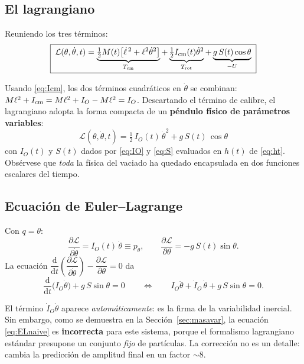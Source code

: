 \documentclass[11pt,a4paper]{article}
\newcommand{\dd}{\mathrm{d}}
\begin{document}
\subsection{El lagrangiano}

Reuniendo los tres términos:
\begin{equation}
\boxed{\;
\mathcal L(\theta,\dot\theta,t) =
\underbrace{\tfrac12 M(t)\!\left[\dot\ell^{\,2}+\ell^2\dot\theta^2\right]}_{T_{\rm cm}}
+\underbrace{\tfrac12 I_{\rm cm}(t)\dot\theta^2}_{T_{\rm rot}}
+\underbrace{g\,S(t)\cos\theta}_{-U}\;}
\label{eq:Lfull}
\end{equation}

Usando \eqref{eq:Icm}, los dos términos cuadráticos en $\dot\theta$ se combinan:
$M\ell^2 + I_{\rm cm} = M\ell^2 + I_O - M\ell^2 = I_O$. Descartando el término de calibre,
el lagrangiano adopta la forma compacta de un \textbf{péndulo físico de parámetros variables}:
\begin{equation}
\boxed{\;
\mathcal L(\theta,\dot\theta,t) = \tfrac12\,I_O(t)\,\dot\theta^2 + g\,S(t)\,\cos\theta\;}
\label{eq:L}
\end{equation}
con $I_O(t)$ y $S(t)$ dados por \eqref{eq:IO} y \eqref{eq:S} evaluados en $h(t)$ de \eqref{eq:ht}.
Obsérvese que \emph{toda} la física del vaciado ha quedado encapsulada en dos funciones escalares
del tiempo.

\subsection{Ecuación de Euler--Lagrange}

Con $q=\theta$:
\begin{equation}
\frac{\partial \mathcal L}{\partial \dot\theta} = I_O(t)\,\dot\theta \equiv p_\theta ,
\qquad
\frac{\partial \mathcal L}{\partial \theta} = -g\,S(t)\sin\theta .
\end{equation}
La ecuación $\dfrac{\dd}{\dd t}\!\left(\dfrac{\partial\mathcal L}{\partial\dot\theta}\right)
-\dfrac{\partial\mathcal L}{\partial\theta}=0$ da
\begin{equation}
\frac{\dd}{\dd t}\Big(I_O\dot\theta\Big) + g\,S\sin\theta = 0
\qquad\Longleftrightarrow\qquad
I_O\ddot\theta + \dot I_O\,\dot\theta + g\,S\sin\theta = 0 .
\label{eq:ELnaive}
\end{equation}

El término $\dot I_O\dot\theta$ aparece \emph{automáticamente}: es la firma de la variabilidad
inercial. Sin embargo, como se demuestra en la Sección~\ref{sec:masavar}, la ecuación
\eqref{eq:ELnaive} es \textbf{incorrecta} para este sistema, porque el formalismo lagrangiano
estándar presupone un conjunto \emph{fijo} de partículas. La corrección no es un detalle:
cambia la predicción de amplitud final en un factor $\sim 8$.
\end{document}
